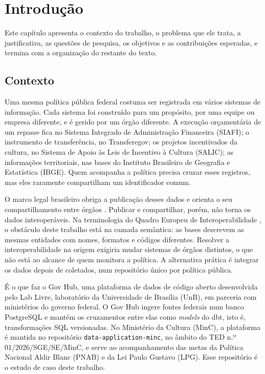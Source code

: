 \chapter{Introdução}
\label{chap:introducao}

Este capítulo apresenta o contexto do trabalho, o problema que ele trata, a
justificativa, as questões de pesquisa, os objetivos e as contribuições
esperadas, e termina com a organização do restante do texto.

\section{Contexto}
\label{sec:introducao-contexto}

Uma mesma política pública federal costuma ser registrada em vários sistemas
de informação. Cada sistema foi construído para um propósito, por uma equipe
ou empresa diferente, e é gerido por um órgão diferente. A execução
orçamentária de um repasse fica no Sistema Integrado de Administração
Financeira (SIAFI); o instrumento de transferência, no Transferegov; os
projetos incentivados da cultura, no Sistema de Apoio às Leis de Incentivo à
Cultura (SALIC); as informações territoriais, nas bases do Instituto
Brasileiro de Geografia e Estatística (IBGE). Quem acompanha a política
precisa cruzar esses registros, mas eles raramente compartilham um
identificador comum.

O marco legal brasileiro obriga a publicação desses dados
\cite{lai2011,decreto8777} e orienta o seu compartilhamento entre órgãos
\cite{decreto10046,lei14129}. Publicar e compartilhar, porém, não torna os
dados interoperáveis. Na terminologia do Quadro Europeu de Interoperabilidade
\cite{eif2017}, o obstáculo deste trabalho está na camada semântica: as bases
descrevem as mesmas entidades com nomes, formatos e códigos diferentes.
Resolver a interoperabilidade na origem exigiria mudar sistemas de órgãos
distintos, o que não está ao alcance de quem monitora a política. A
alternativa prática é integrar os dados depois de coletados, num repositório
único por política pública.

É o que faz o Gov Hub, uma plataforma de dados de código aberto desenvolvida
pelo Lab Livre, laboratório da Universidade de Brasília (UnB), em parceria
com ministérios do governo federal. O Gov Hub ingere fontes federais num
banco PostgreSQL e mantém os cruzamentos entre elas como \emph{models} do dbt,
isto é, transformações SQL versionadas. No Ministério da Cultura (MinC), a
plataforma é mantida no repositório \texttt{data-application-minc}, no âmbito
do TED n.º 01/2026/SGE/SE/MinC, e serve ao acompanhamento das metas da Política
Nacional Aldir Blanc (PNAB) e da Lei Paulo Gustavo (LPG). Esse repositório é
o estudo de caso deste trabalho.

